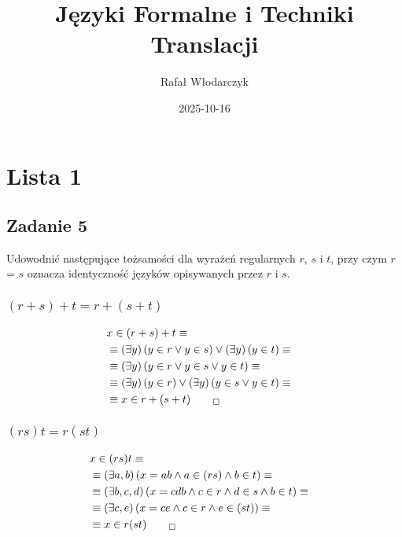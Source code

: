 \documentclass{article}
\title{Języki Formalne i Techniki Translacji}
\author{Rafał Włodarczyk}
\date{2025-10-16}
\begin{document}
\maketitle

\section{Lista 1}

\setcounter{subsection}{4}
\subsection{Zadanie 5}

Udowodnić następujące tożsamości dla wyrażeń regularnych $r$, $s$ i $t$, 
przy czym $r$ = $s$ oznacza identyczność języków opisywanych przez $r$ i $s$.

\subsubsection{$(r+s)+t=r+(s+t)$}

\begin{align}
    &x\in (r+s)+t \equiv&\\
    &\equiv \left(\exists y\right)\left(y\in r \lor y\in s\right) \lor \left(\exists y\right)\left(y \in t\right) \equiv\\
    &\equiv \left(\exists y\right)\left(y\in r \lor y\in s \lor y\in t\right) \equiv\\
    &\equiv \left(\exists y\right)\left(y\in r\right) \lor \left(\exists y\right)\left(y \in s \lor y \in t\right) \equiv\\
    &\equiv x\in r+(s+t)_{\qed}
\end{align}

\subsubsection{$(rs)t=r(st)$}

\begin{align}
    &x\in (rs)t \equiv&\\
    &\equiv \left(\exists a,b \right)\left(x=ab \land a\in(rs) \land b\in t\right) \equiv\\
    &\equiv \left(\exists b,c,d \right)\left(x=cdb \land c\in r \land d\in s \land b\in t\right) \equiv\\
    &\equiv \left(\exists c,e \right)\left(x=ce \land c\in r \land e\in(st)\right) \equiv\\
    &\equiv x\in r(st)_{\qed}
\end{align}
\end{document}
